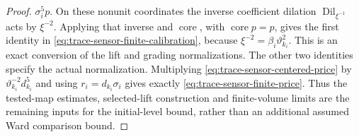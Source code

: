 \begin{proof}
$\sigma_i^5p$. On these nonunit coordinates the inverse coefficient
dilation $\operatorname{Dil}_{\xi^{-1}}$ acts by $\xi^{-2}$. Applying that inverse
and $\operatorname{core}$, with $\operatorname{core}p=p$, gives the first identity in
\eqref{eq:trace-sensor-finite-calibration}, because
$\xi^{-2}=\beta_i\vartheta_{k_i}^2$. This is an exact conversion of the
lift and grading normalizations.
The other two identities specify the actual normalization. Multiplying
\eqref{eq:trace-sensor-centered-price} by
$\vartheta_{k_i}^{-2}d_{k_i}^5$ and using $r_i=d_{k_i}\sigma_i$ gives exactly
\eqref{eq:trace-sensor-finite-price}. Thus the tested-map estimates,
selected-lift construction and finite-volume limits are the remaining
inputs for the initial-level bound, rather than an additional assumed
Ward comparison bound.
\end{proof}

